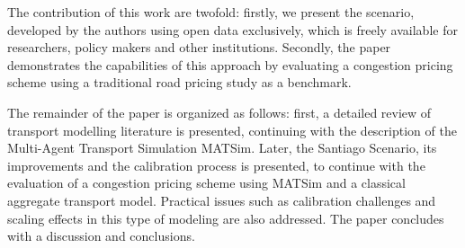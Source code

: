 \documentclass[Journal,letterpaper]{ascelike-new}
\begin{document}
The contribution of this work are twofold: firstly, we present the scenario, developed by the authors using open data exclusively, which is freely available for researchers, policy makers and other institutions. Secondly, the paper demonstrates the capabilities of this approach by evaluating a congestion pricing scheme using a traditional road pricing study as a benchmark.

The remainder of the paper is organized as follows: first, a detailed review of transport modelling literature is presented, continuing with the description of the Multi-Agent Transport Simulation MATSim. Later, the Santiago Scenario, its improvements and the calibration process is presented, to continue with the evaluation of a congestion pricing scheme using MATSim and a classical aggregate transport model. Practical issues such as calibration challenges and scaling effects in this type of modeling are also addressed. The paper concludes with a discussion and conclusions.

\end{document}
